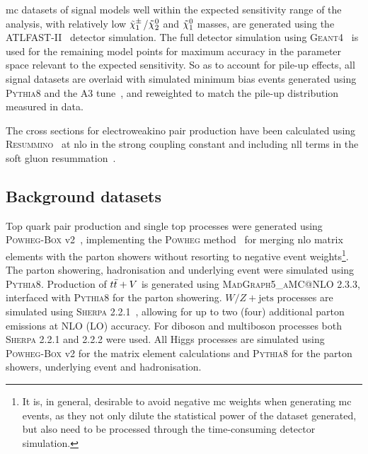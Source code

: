 \gls{mc} datasets of signal models well within the expected sensitivity range of the analysis, \ie with relatively low $\tilde{\chi}_1^\pm$/$\tilde{\chi}_2^0$ and $\tilde{\chi}_1^0$ masses, are generated using the \textsc{ATLFAST-II}~\cite{Aad:2010ah} detector simulation. The full detector simulation using \textsc{Geant4}~\cite{geant:2002hh} is used for the remaining model points for maximum accuracy in the parameter space relevant to the expected sensitivity. So as to account for pile-up effects, all signal datasets are overlaid with simulated minimum bias events generated using \textsc{Pythia8} and the A3 tune~\cite{ATL-PHYS-PUB-2016-017}, and reweighted to match the pile-up distribution measured in data. 

The cross sections for electroweakino pair production have been calculated using \mbox{\textsc{Resummino}}~\cite{Fuks:2013vua} at \gls{nlo} in the strong coupling constant and including \gls{nll} terms in the soft gluon resummation~\cite{Fiaschi:2018hgm,Fuks:2012qx}.

\subsection{Background datasets}

Top quark pair production and single top processes were generated using \textsc{Powheg-Box} v2~\cite{PowhegBox:2010xd}, implementing the \textsc{Powheg} method~\cite{Powheg1,Powheg2} for merging \gls{nlo} matrix elements with the parton showers without resorting to negative event weights\footnote{It is, in general, desirable to avoid negative \gls{mc} weights when generating \gls{mc} events, as they not only dilute the statistical power of the dataset generated, but also need to be processed through the time-consuming detector simulation.}.
The parton showering, hadronisation and underlying event were simulated using \textsc{Pythia8}. Production of $t\bar{t}+V$ is generated using \textsc{MadGraph5\_aMC@NLO} 2.3.3, interfaced with \textsc{Pythia8} for the parton showering. 
$W/Z+\mathrm{jets}$ processes are simulated using \textsc{Sherpa} 2.2.1~\cite{Gleisberg:2008ta,Bothmann:2019yzt}, allowing for up to two (four) additional parton emissions at NLO (LO) accuracy. 
For diboson and multiboson  processes both \textsc{Sherpa} 2.2.1 and 2.2.2 were used. 
All Higgs processes are simulated using \textsc{Powheg-Box} v2 for the matrix element calculations and \textsc{Pythia8} for the parton showers, underlying event and hadronisation. 


